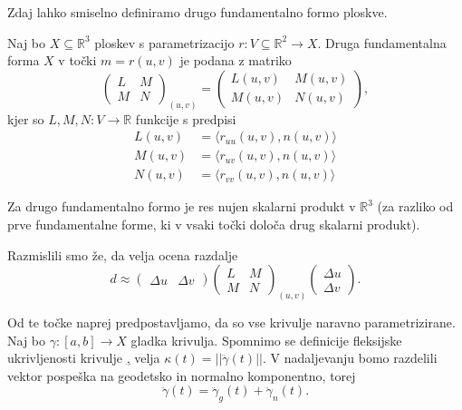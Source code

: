 Zdaj lahko smiselno definiramo drugo fundamentalno formo ploskve.

\begin{definicija}
\label{def_druga_fundamentalna_forma_ploskve}
 Naj bo $X \subseteq \mathbb{R}^3$ ploskev s parametrizacijo $r: V \subseteq \mathbb{R}^2 \to  X$. Druga fundamentalna forma $X$ v točki $m = r(u,v)$ je podana z matriko 
 \begin{equation*} \begin{pmatrix}
 L & M \\
 M & N
 \end{pmatrix}_{(u,v)} = \begin{pmatrix}
 L(u,v) & M(u,v) \\
 M(u,v) & N(u,v)
 \end{pmatrix}, \end{equation*}
 kjer so $L, M, N: V \to  \mathbb{R}$ funkcije s predpisi 
 \begin{align*}
    L(u,v)  &= \langle r_{uu}(u,v), n(u,v) \rangle  \\
    M(u,v)  &= \langle r_{uv}(u,v), n(u,v) \rangle  \\
    N(u,v)  &= \langle r_{vv}(u,v), n(u,v) \rangle  
 \end{align*}

\end{definicija}

\begin{opomba}
    Za drugo fundamentalno formo je res nujen skalarni produkt v $\mathbb{R}^3$ (za razliko od prve fundamentalne forme, ki v vsaki točki določa drug skalarni produkt). 
\end{opomba}

Razmislili smo že, da velja ocena razdalje
\begin{equation*} d \approx \begin{pmatrix}
  \Delta u  &  \Delta v 
\end{pmatrix} \begin{pmatrix}
  L & M \\
  M & N
\end{pmatrix}_{(u,v)}  
\begin{pmatrix}
  \Delta u \\
  \Delta v 
\end{pmatrix}.\end{equation*}

Od te točke naprej predpostavljamo, da so vse krivulje naravno parametrizirane. Naj bo $\gamma: [a,b] \to X$ gladka krivulja. 
Spomnimo se definicije fleksijske ukrivljenosti krivulje \href{def_fleksijska_ukrivljenost}, velja $\kappa(t) = \lvert\lvert \ddot{\gamma}(t) \rvert\rvert$.
V nadaljevanju bomo razdelili vektor pospeška na geodetsko in normalno komponentno, torej 
\begin{equation*} \ddot{\gamma}(t) = \ddot{\gamma}_g(t) + \ddot{\gamma}_n(t).\end{equation*}

